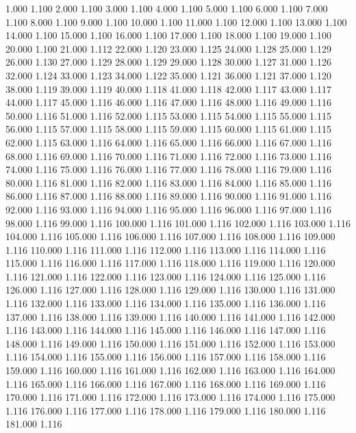 1.000 1.100 
2.000 1.100 
3.000 1.100 
4.000 1.100 
5.000 1.100 
6.000 1.100 
7.000 1.100 
8.000 1.100 
9.000 1.100 
10.000 1.100 
11.000 1.100 
12.000 1.100 
13.000 1.100 
14.000 1.100 
15.000 1.100 
16.000 1.100 
17.000 1.100 
18.000 1.100 
19.000 1.100 
20.000 1.100 
21.000 1.112 
22.000 1.120 
23.000 1.125 
24.000 1.128 
25.000 1.129 
26.000 1.130 
27.000 1.129 
28.000 1.129 
29.000 1.128 
30.000 1.127 
31.000 1.126 
32.000 1.124 
33.000 1.123 
34.000 1.122 
35.000 1.121 
36.000 1.121 
37.000 1.120 
38.000 1.119 
39.000 1.119 
40.000 1.118 
41.000 1.118 
42.000 1.117 
43.000 1.117 
44.000 1.117 
45.000 1.116 
46.000 1.116 
47.000 1.116 
48.000 1.116 
49.000 1.116 
50.000 1.116 
51.000 1.116 
52.000 1.115 
53.000 1.115 
54.000 1.115 
55.000 1.115 
56.000 1.115 
57.000 1.115 
58.000 1.115 
59.000 1.115 
60.000 1.115 
61.000 1.115 
62.000 1.115 
63.000 1.116 
64.000 1.116 
65.000 1.116 
66.000 1.116 
67.000 1.116 
68.000 1.116 
69.000 1.116 
70.000 1.116 
71.000 1.116 
72.000 1.116 
73.000 1.116 
74.000 1.116 
75.000 1.116 
76.000 1.116 
77.000 1.116 
78.000 1.116 
79.000 1.116 
80.000 1.116 
81.000 1.116 
82.000 1.116 
83.000 1.116 
84.000 1.116 
85.000 1.116 
86.000 1.116 
87.000 1.116 
88.000 1.116 
89.000 1.116 
90.000 1.116 
91.000 1.116 
92.000 1.116 
93.000 1.116 
94.000 1.116 
95.000 1.116 
96.000 1.116 
97.000 1.116 
98.000 1.116 
99.000 1.116 
100.000 1.116 
101.000 1.116 
102.000 1.116 
103.000 1.116 
104.000 1.116 
105.000 1.116 
106.000 1.116 
107.000 1.116 
108.000 1.116 
109.000 1.116 
110.000 1.116 
111.000 1.116 
112.000 1.116 
113.000 1.116 
114.000 1.116 
115.000 1.116 
116.000 1.116 
117.000 1.116 
118.000 1.116 
119.000 1.116 
120.000 1.116 
121.000 1.116 
122.000 1.116 
123.000 1.116 
124.000 1.116 
125.000 1.116 
126.000 1.116 
127.000 1.116 
128.000 1.116 
129.000 1.116 
130.000 1.116 
131.000 1.116 
132.000 1.116 
133.000 1.116 
134.000 1.116 
135.000 1.116 
136.000 1.116 
137.000 1.116 
138.000 1.116 
139.000 1.116 
140.000 1.116 
141.000 1.116 
142.000 1.116 
143.000 1.116 
144.000 1.116 
145.000 1.116 
146.000 1.116 
147.000 1.116 
148.000 1.116 
149.000 1.116 
150.000 1.116 
151.000 1.116 
152.000 1.116 
153.000 1.116 
154.000 1.116 
155.000 1.116 
156.000 1.116 
157.000 1.116 
158.000 1.116 
159.000 1.116 
160.000 1.116 
161.000 1.116 
162.000 1.116 
163.000 1.116 
164.000 1.116 
165.000 1.116 
166.000 1.116 
167.000 1.116 
168.000 1.116 
169.000 1.116 
170.000 1.116 
171.000 1.116 
172.000 1.116 
173.000 1.116 
174.000 1.116 
175.000 1.116 
176.000 1.116 
177.000 1.116 
178.000 1.116 
179.000 1.116 
180.000 1.116 
181.000 1.116 
